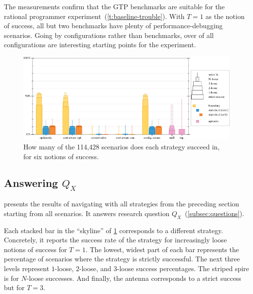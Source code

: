 The measurements confirm that the GTP benchmarks are suitable for
the rational programmer experiment~(\cref{t:baseline-trouble}).
With $T = 1$ as the notion of success, all but two benchmarks
have plenty of performance-debugging scenarios.
Going by configurations rather than benchmarks, over  of all
configurations are interesting starting points for the experiment.

\begin{figure}[ht]
  \includegraphics[width=\columnwidth]{data/strategy-overall-feasible.pdf}
  \caption{How many of the 114,428 scenarios does each strategy succeed in, for six notions of success.}
  \label{f:strategy-overall}
\end{figure}

\subsection{Answering $Q_X$} \label{subsec:qx}

 presents the results of navigating with all strategies
from the preceding section starting from all scenarios. It answers
research question $Q_X$~(\cref{subsec:questions}).

Each stacked bar in the ``skyline'' of \cref{f:strategy-overall} corresponds to
a different strategy. Concretely, it reports the success
rate of the strategy for increasingly loose notions of success for $T = 1$.  The
lowest, widest part of each bar represents the percentage of scenarios where the
strategy is strictly successful. The next three levels represent $1$-loose,
$2$-loose, and $3$-loose success percentages.  The striped spire is for
$N$-loose successes.  And finally, the antenna corresponds to a
strict success but for $T = 3$.

